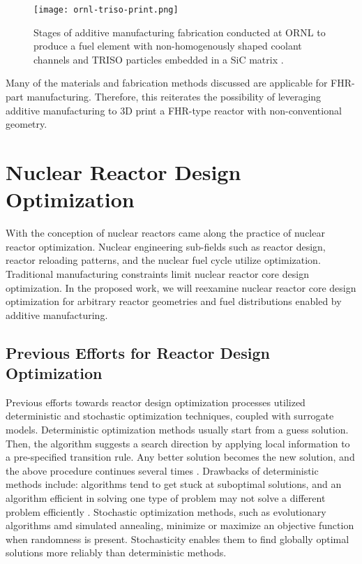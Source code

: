 \begin{figure}[]
    \centering
    \texttt{[image: ornl-triso-print.png]} 
    \caption{Stages of additive manufacturing fabrication conducted at \acrlong{ORNL} to 
    produce a fuel element with non-homogenously shaped coolant channels and
    \gls{TRISO} particles embedded in a SiC matrix \cite{trammell_advanced_2019}.}
    \label{fig:ornl-triso-print}
\end{figure}

Many of the materials and fabrication methods discussed are applicable 
for \gls{FHR}-part manufacturing. 
Therefore, this reiterates the possibility of leveraging additive manufacturing to 3D print a
\gls{FHR}-type reactor with non-conventional geometry. 

\section{Nuclear Reactor Design Optimization}
\label{sec:opt}
With the conception of nuclear reactors came along the practice of nuclear 
reactor optimization. 
Nuclear engineering sub-fields such as reactor design, reactor reloading 
patterns, and the nuclear fuel cycle utilize optimization.  
Traditional manufacturing constraints limit nuclear reactor core 
design optimization. 
In the proposed work, we will reexamine nuclear reactor core 
design optimization for arbitrary reactor geometries and fuel distributions
enabled by additive manufacturing. 

\subsection{Previous Efforts for Reactor Design Optimization}
Previous efforts towards reactor design optimization processes utilized 
deterministic and stochastic optimization techniques, coupled with surrogate 
models. 
Deterministic optimization methods usually start from a guess solution.
Then, the algorithm suggests a search direction by applying local 
information to a pre-specified transition rule. 
Any better solution becomes the new solution, and the above procedure continues 
several times \cite{deb_multi-objective_2001}. 
Drawbacks of deterministic methods include: algorithms tend to get stuck at
suboptimal solutions, and an algorithm efficient in solving one type of problem 
may not solve a different problem efficiently \cite{deb_multi-objective_2001}. 
Stochastic optimization methods, such as evolutionary algorithms amd simulated annealing,  
minimize or maximize an objective function when randomness is present. 
Stochasticity enables them to find globally optimal solutions more reliably than 
deterministic methods. 

